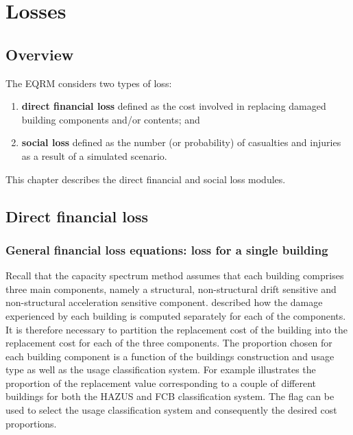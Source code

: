 \chapter{Losses}
\label{ch:losses}

\section{Overview}
The EQRM considers two types of loss:
\begin{enumerate}
\item \textbf{direct financial loss} defined as the cost involved
in replacing damaged building components and/or contents; and
\item \textbf{social loss} defined as the number (or probability)
of casualties and injuries as a result of a simulated scenario.
\end{enumerate}
This chapter describes the direct financial and social loss
modules.

\section{Direct financial loss}

\subsection{General financial loss equations: loss for a single building}

Recall that the capacity spectrum method assumes that each building comprises three main
components, namely a structural, non-structural drift sensitive
and non-structural acceleration sensitive component.
 described how the damage experienced by each
building is computed separately for each of the components. It is
therefore necessary to partition the replacement cost of the
building into the replacement cost for each of the three
components. The proportion chosen for each building component is a
function of the buildings construction and usage type as well as
the usage classification system. For example
 illustrates the proportion of the
replacement value corresponding to a couple of different buildings
for both the HAZUS and
FCB classification system. The
 flag  can
be used to select the usage classification system and consequently
the desired cost proportions.

